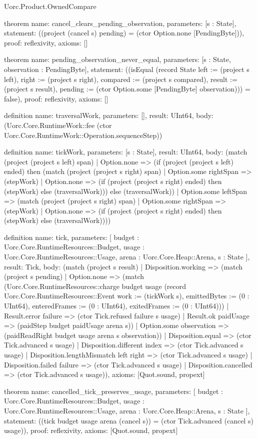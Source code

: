 \begin{lexlean}{Uorc.Product.OwnedCompare}
\begin{semanticmodule}
theorem{
  name: cancel_clears_pending_observation,
  parameters: [s : State],
  statement: ((project (cancel s) pending) = (ctor Option.none [PendingByte])),
  proof: reflexivity{},
  axioms: []
}

theorem{
  name: pending_observation_never_equal,
  parameters: [s : State, observation : PendingByte],
  statement: ((isEqual (record State {left := (project s left), right := (project s right), compared := (project s compared), result := (project s result), pending := (ctor Option.some [PendingByte] observation)})) = false),
  proof: reflexivity{},
  axioms: []
}

definition{
  name: traversalWork,
  parameters: [],
  result: UInt64,
  body: (Uorc.Core.RuntimeWork::fee (ctor Uorc.Core.RuntimeWork::Operation.sequenceStep))
}

definition{
  name: tickWork,
  parameters: [s : State],
  result: UInt64,
  body: (match (project (project s left) span)
    | Option.none => (if (project (project s left) ended) then (match (project (project s right) span)
      | Option.some rightSpan => (stepWork)
      | Option.none => (if (project (project s right) ended) then (stepWork) else (traversalWork))) else (traversalWork))
    | Option.some leftSpan => (match (project (project s right) span)
      | Option.some rightSpan => (stepWork)
      | Option.none => (if (project (project s right) ended) then (stepWork) else (traversalWork))))
}

definition{
  name: tick,
  parameters: [
    budget : Uorc.Core.RuntimeResources::Budget,
    usage : Uorc.Core.RuntimeResources::Usage,
    arena : Uorc.Core.Heap::Arena,
    s : State
  ],
  result: Tick,
  body: (match (project s result)
    | Disposition.working => (match (project s pending)
      | Option.none => (match (Uorc.Core.RuntimeResources::charge budget usage (record Uorc.Core.RuntimeResources::Event {work := (tickWork s), emittedBytes := (0 : UInt64), enteredFrames := (0 : UInt64), exitedFrames := (0 : UInt64)}))
        | Result.error failure => (ctor Tick.refused failure s usage)
        | Result.ok paidUsage => (paidStep budget paidUsage arena s))
      | Option.some observation => (paidReadRight budget usage arena s observation))
    | Disposition.equal => (ctor Tick.advanced s usage)
    | Disposition.different index => (ctor Tick.advanced s usage)
    | Disposition.lengthMismatch left right => (ctor Tick.advanced s usage)
    | Disposition.failed failure => (ctor Tick.advanced s usage)
    | Disposition.cancelled => (ctor Tick.advanced s usage)),
  axioms: [Quot.sound, propext]
}

theorem{
  name: cancelled_tick_preserves_usage,
  parameters: [
    budget : Uorc.Core.RuntimeResources::Budget,
    usage : Uorc.Core.RuntimeResources::Usage,
    arena : Uorc.Core.Heap::Arena,
    s : State
  ],
  statement: ((tick budget usage arena (cancel s)) = (ctor Tick.advanced (cancel s) usage)),
  proof: reflexivity{},
  axioms: [Quot.sound, propext]
}
\end{semanticmodule}
\end{lexlean}
